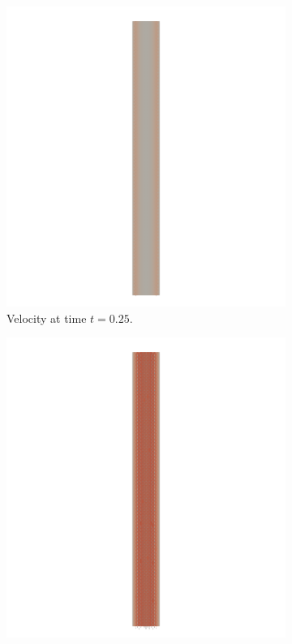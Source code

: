 \documentclass[a4paper,11pt,openright,twoside]{book}
\begin{document}
\begin{figure}[h!]
\begin{subfigure}[b]{0.5\linewidth}
    \centering
    \includegraphics[width=1.2\linewidth]{images/velocity_fixed_025.png}
        \centering 
    \caption{Velocity at time $t = 0.25$.} 
    \label{fig1:b} 
    \vspace{4ex}
  \end{subfigure} 
  \begin{subfigure}[b]{0.5\linewidth}
    \centering
    \includegraphics[width=1.2\linewidth]{images/velocity_fixed_050.png} 

\end{subfigure}
\end{figure}
\end{document}
